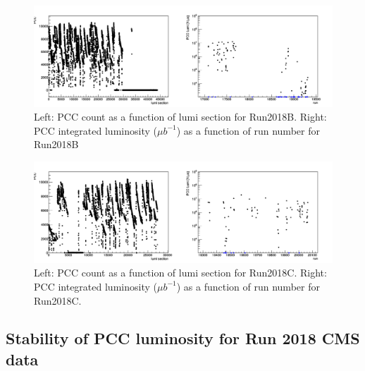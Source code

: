 \begin{figure}[H]
  \centering
  \includegraphics[width=1\columnwidth]{./lumiB_merged.png}
  \caption{Left: PCC count as a function of lumi section for Run2018B. Right: PCC integrated luminosity ($\mu b^{-1}$) as a function of run number for Run2018B}
  \label{fig:CMS}
\end{figure}

\begin{figure}[H]
  \centering
  \includegraphics[width=1\columnwidth]{./lumiC_merged.png}
  \caption{Left: PCC count as a function of lumi section for Run2018C. Right: PCC integrated luminosity ($\mu b^{-1}$) as a function of run number for Run2018C.}
  \label{fig:CMS}
\end{figure}


\subsection{Stability of PCC luminosity for Run 2018 CMS data}

